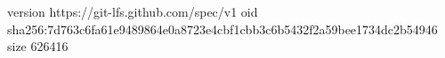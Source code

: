 version https://git-lfs.github.com/spec/v1
oid sha256:7d763c6fa61e9489864e0a8723e4cbf1cbb3c6b5432f2a59bee1734dc2b54946
size 626416
